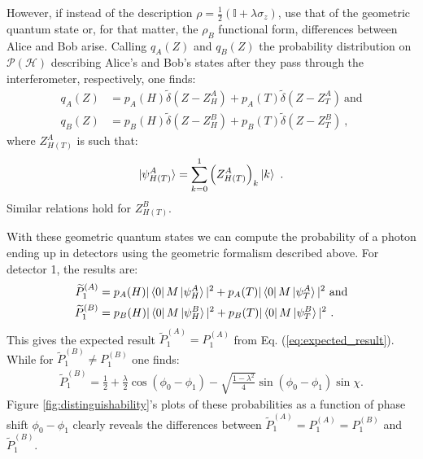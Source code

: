 \documentclass[draft,nofootinbib,prl,twocolumn,showpacs,showkeys,groupaddress,preprintnumbers,floatfix]{revtex4-1}
\newcommand{\1}{\mathbbm{1}}
\begin{document}
However, if instead of the description $\rho = \frac{1}{2}\left(
\mathbb{I}+\lambda \sigma_z\right)$, use that of the geometric quantum state
or, for that matter, the $\rho_B$ functional form, differences between Alice
and Bob arise. Calling $q_A(Z)$ and $q_B(Z)$ the probability distribution on
$\mathcal{P}(\mathcal{H})$ describing Alice's and Bob's states after they pass
through the interferometer, respectively, one finds:
\begin{subequations}
\begin{align}
q_A(Z) & \!=\! p_A(H) \widetilde{\delta}(Z - Z_H^A)
  + p_A(T) \widetilde{\delta}(Z - Z_T^A)
  ~\text{and} \\ 
q_B(Z) & \!=\! p_B(H) \widetilde{\delta}(Z - Z_H^B)
  + p_B(T) \widetilde{\delta}(Z - Z_T^B)
  ~,
\end{align}
\end{subequations}
where $Z_{H(T)}^A$ is such that:
\begin{align*}
\ket{\psi_{H(T)}^A} = \sum_{k=0}^1 \left( Z_{H(T)}^A \right)_k \ket{k}
  ~.
\end{align*}
Similar relations hold for $Z_{H(T)}^B$.

With these geometric quantum states we can compute the probability of a photon
ending up in detectors using the geometric formalism described above. For
detector 1, the results are:
\begin{align*}
\widetilde{P}_1^{(A)} & = p_A(H)\vert\bra{0}M\ket{\psi_H^A}\vert^2
  + p_A(T)\vert\bra{0}M\ket{\psi_T^A}\vert^2 ~\text{and} \\
\widetilde{P}_1^{(B)} & = p_B(H)\vert\bra{0}M\ket{\psi_H^B}\vert^2
  + p_B(T)\vert\bra{0}M\ket{\psi_T^B}\vert^2
  ~.
\end{align*}
This gives the expected result $\widetilde{P}_1^{(A)}
=P_1^{(A)}$ from Eq. (\ref{eq:expected_result}). While for
$\widetilde{P}_1^{(B)}\neq P_1^{(B)}$ one finds:
\begin{align}
\widetilde{P}_1^{(B)} \!=\! \frac{1}{2}
  \!+\! \frac{\lambda}{2} \cos (\phi_0 \!-\!\phi_1)
  \!-\! \sqrt{\frac{1-\lambda^2}{4}} \sin (\phi_0\!-\!\phi_1)
  \sin \chi
  .
\label{eq:new_result}
\end{align}
Figure \ref{fig:distinguishability}'s plots of these probabilities as a
function of phase shift $\phi_0-\phi_1$ clearly reveals the differences between
$\widetilde{P}_1^{(A)} = P_1^{(A)} = P_1^{(B)}$ and $\widetilde{P}_1^{(B)}$.
\end{document}
